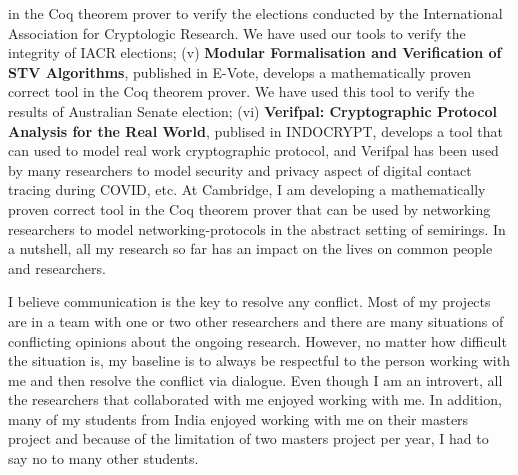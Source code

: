 \documentclass[11pt,a4paper,roman]{moderncv}
\begin{document}
in the Coq theorem prover to verify the elections conducted by 
the International Association for Cryptologic Research. We have used 
our tools to verify the integrity of IACR elections; (v) \textbf{Modular Formalisation and 
Verification of STV Algorithms}, published in E-Vote, develops a mathematically proven 
correct tool in the Coq theorem prover. We have used this tool to verify
the results of Australian Senate election; 
(vi) \textbf{Verifpal: Cryptographic Protocol Analysis for the Real World}, publised in 
INDOCRYPT, develops a tool that can used to model real work cryptographic protocol, and 
Verifpal has been used by many researchers to model security and privacy aspect of 
digital contact tracing during COVID, etc.
At Cambridge, I am developing a mathematically proven correct tool in the Coq theorem prover 
that can be used by networking researchers to model networking-protocols in the abstract 
setting of semirings.
In a nutshell, all my research so far has an impact on the lives on common people and 
researchers.  



I believe communication is the key to resolve any conflict. 
Most of my projects are in a team with one or two other researchers and there are
many situations of conflicting opinions about the ongoing research. However, no matter 
how difficult the situation is, my baseline is to always be respectful to 
the person working with me and then resolve the conflict via dialogue.  
Even though I am an introvert, 
all the researchers that collaborated with me 
enjoyed working with me. In addition, many of my students from India enjoyed working with 
me on their masters project and because of the limitation of two masters project per year, 
I had to say no to many other students.




\vspace{0.5cm}


\makeletterclosing
\end{document}
